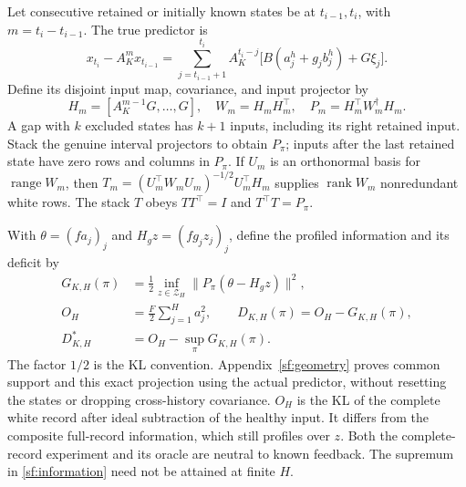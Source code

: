 Let consecutive retained or initially known states be at $t_{i-1},t_i$,
with $m=t_i-t_{i-1}$. The true predictor is
\begin{equation}\label{sf:predictor}
x_{t_i}-A_K^m x_{t_{i-1}}
=\sum_{j=t_{i-1}+1}^{t_i}A_K^{t_i-j}
\bigl[B(a_j^h+g_jb_j^h)+G\xi_j\bigr].
\end{equation}
Define its disjoint input map, covariance, and input projector by
\begin{equation}\label{sf:interval}
H_m=[A_K^{m-1}G,\ldots,G],\quad W_m=H_mH_m^\top,\quad
P_m=H_m^\top W_m^\dagger H_m .
\end{equation}
A gap with $k$ excluded states has $k+1$ inputs, including its right retained
input. Stack the genuine interval projectors to obtain $P_\pi$; inputs after
the last retained state have zero rows and columns in $P_\pi$.
If $U_m$ is an orthonormal basis for $\operatorname{range}W_m$, then
$T_m=(U_m^\top W_mU_m)^{-1/2}U_m^\top H_m$ supplies
$\operatorname{rank}W_m$ nonredundant white rows. The stack $T$ obeys
$TT^\top=I$ and $T^\top T=P_\pi$.

With $\theta=(fa_j)_j$ and $H_gz=(fg_jz_j)_j$, define the profiled information
and its deficit by
\begin{equation}\label{sf:information}
\begin{split}
G_{K,H}(\pi)&=\tfrac12\inf_{z\in\mathcal Z_H}
\|P_\pi(\theta-H_gz)\|^2,\\
O_H&=\tfrac F2\sum_{j=1}^Ha_j^2,\qquad
D_{K,H}(\pi)=O_H-G_{K,H}(\pi),\\
D_{K,H}^*&=O_H-\sup_\pi G_{K,H}(\pi).
\end{split}
\end{equation}
The factor $1/2$ is the KL convention. Appendix~\ref{sf:geometry} proves
common support and this exact projection using the actual predictor,
without resetting the states or dropping cross-history covariance.
$O_H$ is the KL of the complete white record after ideal subtraction of
the healthy input. It differs from the composite full-record information,
which still profiles over $z$. Both the complete-record experiment and its
oracle are neutral to known feedback. The supremum in
\eqref{sf:information} need not be attained at finite $H$.

